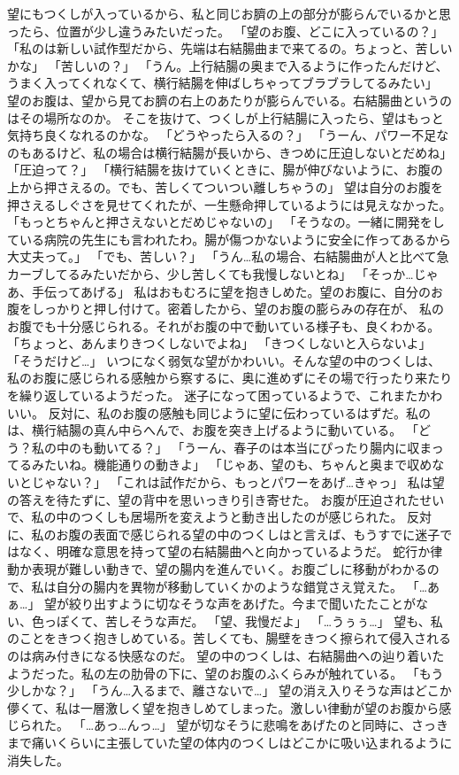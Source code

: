 望にもつくしが入っているから、私と同じお臍の上の部分が膨らんでいるかと思ったら、位置が少し違うみたいだった。
「望のお腹、どこに入っているの？」
「私のは新しい試作型だから、先端は右結腸曲まで来てるの。ちょっと、苦しいかな」
「苦しいの？」
「うん。上行結腸の奥まで入るように作ったんだけど、うまく入ってくれなくて、横行結腸を伸ばしちゃってブラブラしてるみたい」
望のお腹は、望から見てお臍の右上のあたりが膨らんでいる。右結腸曲というのはその場所なのか。
そこを抜けて、つくしが上行結腸に入ったら、望はもっと気持ち良くなれるのかな。
「どうやったら入るの？」
「うーん、パワー不足なのもあるけど、私の場合は横行結腸が長いから、きつめに圧迫しないとだめね」
「圧迫って？」
「横行結腸を抜けていくときに、腸が伸びないように、お腹の上から押さえるの。でも、苦しくてついつい離しちゃうの」
望は自分のお腹を押さえるしぐさを見せてくれたが、一生懸命押しているようには見えなかった。
「もっとちゃんと押さえないとだめじゃないの」
「そうなの。一緒に開発をしている病院の先生にも言われたわ。腸が傷つかないように安全に作ってあるから大丈夫って。」
「でも、苦しい？」
「うん…私の場合、右結腸曲が人と比べて急カーブしてるみたいだから、少し苦しくても我慢しないとね」
「そっか…じゃあ、手伝ってあげる」
私はおもむろに望を抱きしめた。望のお腹に、自分のお腹をしっかりと押し付けて。密着したから、望のお腹の膨らみの存在が、
私のお腹でも十分感じられる。それがお腹の中で動いている様子も、良くわかる。
「ちょっと、あんまりきつくしないでよね」
「きつくしないと入らないよ」
「そうだけど…」
いつになく弱気な望がかわいい。そんな望の中のつくしは、私のお腹に感じられる感触から察するに、奥に進めずにその場で行ったり来たりを繰り返しているようだった。
迷子になって困っているようで、これまたかわいい。
反対に、私のお腹の感触も同じように望に伝わっているはずだ。私のは、横行結腸の真ん中らへんで、お腹を突き上げるように動いている。
「どう？私の中のも動いてる？」
「うーん、春子のは本当にぴったり腸内に収まってるみたいね。機能通りの動きよ」
「じゃあ、望のも、ちゃんと奥まで収めないとじゃない？」
「これは試作だから、もっとパワーをあげ…きゃっ」
私は望の答えを待たずに、望の背中を思いっきり引き寄せた。
お腹が圧迫されたせいで、私の中のつくしも居場所を変えようと動き出したのが感じられた。
反対に、私のお腹の表面で感じられる望の中のつくしはと言えば、もうすでに迷子ではなく、明確な意思を持って望の右結腸曲へと向かっているようだ。
蛇行か律動か表現が難しい動きで、望の腸内を進んでいく。お腹ごしに移動がわかるので、私は自分の腸内を異物が移動していくかのような錯覚さえ覚えた。
「…あぁ…」
望が絞り出すように切なそうな声をあげた。今まで聞いたたことがない、色っぽくて、苦しそうな声だ。
「望、我慢だよ」
「…うぅぅ…」
望も、私のことをきつく抱きしめている。苦しくても、腸壁をきつく擦られて侵入されるのは病み付きになる快感なのだ。
望の中のつくしは、右結腸曲への辿り着いたようだった。私の左の肋骨の下に、望のお腹のふくらみが触れている。
「もう少しかな？」
「うん…入るまで、離さないで…」
望の消え入りそうな声はどこか儚くて、私は一層激しく望を抱きしめてしまった。激しい律動が望のお腹から感じられた。
「…あっ…んっ…」
望が切なそうに悲鳴をあげたのと同時に、さっきまで痛いくらいに主張していた望の体内のつくしはどこかに吸い込まれるように消失した。

